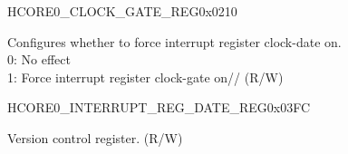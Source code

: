 \begin{register}{H}{CORE0\_CLOCK\_GATE\_REG}{0x0210}\label{regdesc:CORE0CLOCKGATEREG}
%
%
\regnewline%
\begin{regdesc}\begin{reglist}
\label{fielddesc:CORE0REGCLKEN}\item [CORE0\_REG\_CLK\_EN] Configures whether to force interrupt register clock-date on.\\
0: No effect \\
1: Force interrupt register clock-gate on//
(R/W)
\end{reglist}\end{regdesc}
\end{register}


\begin{register}{H}{CORE0\_INTERRUPT\_REG\_DATE\_REG}{0x03FC}\label{regdesc:CORE0INTERRUPTREGDATEREG}
%
%
\regnewline%
\begin{regdesc}\begin{reglist}
\label{fielddesc:CORE0INTERRUPTREGDATE}\item [CORE0\_INTERRUPT\_REG\_DATE] Version control register. (R/W)
\end{reglist}\end{regdesc}
\end{register}

